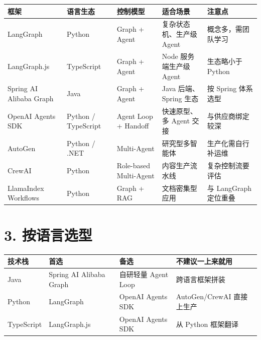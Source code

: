 \documentclass[9pt,a4paper,twocolumn]{ctexart}
\begin{document}
{\footnotesize
\begin{tabular}{|p{}|p{}|p{}|p{}|p{}|}
\hline
\textbf{框架} & \textbf{语言生态} & \textbf{控制模型} & \textbf{适合场景} & \textbf{注意点} \\
\hline
LangGraph & Python & Graph + Agent & 复杂状态机、生产级 Agent & 概念多，需团队学习 \\
\hline
LangGraph.js & TypeScript & Graph + Agent & Node 服务端生产级 Agent & 生态略小于 Python \\
\hline
Spring AI Alibaba Graph & Java & Graph + Agent & Java 后端、Spring 生态 & 按 Spring 体系选型 \\
\hline
OpenAI Agents SDK & Python / TypeScript & Agent Loop + Handoff & 快速原型、多 Agent 交接 & 与供应商绑定较深 \\
\hline
AutoGen & Python / .NET & Multi-Agent & 研究型多智能体 & 生产化需自行补运维 \\
\hline
CrewAI & Python & Role-based Multi-Agent & 内容生产流水线 & 复杂控制流要评估 \\
\hline
LlamaIndex Workflows & Python & Graph + RAG & 文档密集型应用 & 与 LangGraph 定位重叠 \\
\hline
\end{tabular}
}



\section*{3. 按语言选型}

{\footnotesize
\begin{tabular}{|p{}|p{}|p{}|p{}|}
\hline
\textbf{技术栈} & \textbf{首选} & \textbf{备选} & \textbf{不建议一上来就用} \\
\hline
Java & Spring AI Alibaba Graph & 自研轻量 Agent Loop & 跨语言框架拼装 \\
\hline
Python & LangGraph & OpenAI Agents SDK & AutoGen/CrewAI 直接上生产 \\
\hline
TypeScript & LangGraph.js & OpenAI Agents SDK & 从 Python 框架翻译 \\
\hline
\end{tabular}
}
\end{document}
